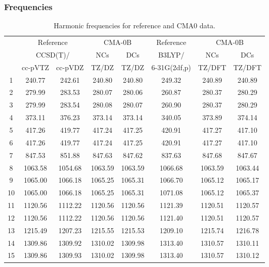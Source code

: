 \documentclass[10pt,oneside]{article}
\begin{document}
\subsubsection*{Frequencies}
\begin{table}[h!]
\centering
\caption{Harmonic frequencies for reference and CMA0 data.}
\begin{tabular}{cccccccc}
\toprule
{} & \multicolumn{2}{c}{Reference} & \multicolumn{2}{c}{CMA-0B} &    Reference & \multicolumn{2}{c}{CMA-0B} \\
{} & \multicolumn{2}{c}{CCSD(T)/} &     NCs &     DCs &       B3LYP/ &     NCs &     DCs \\
{} &   cc-pVTZ & cc-pVDZ &   TZ/DZ &   TZ/DZ & 6-31G(2df,p) &  TZ/DFT &  TZ/DFT \\
\midrule
1  &    240.77 &  242.61 &  240.80 &  240.80 &       249.32 &  240.89 &  240.89 \\
2  &    279.99 &  283.53 &  280.07 &  280.06 &       260.87 &  280.37 &  280.29 \\
3  &    279.99 &  283.54 &  280.08 &  280.07 &       260.90 &  280.37 &  280.29 \\
4  &    373.11 &  376.23 &  373.14 &  373.14 &       340.05 &  373.89 &  374.14 \\
5  &    417.26 &  419.77 &  417.24 &  417.25 &       420.91 &  417.27 &  417.10 \\
6  &    417.26 &  419.77 &  417.24 &  417.25 &       420.91 &  417.27 &  417.10 \\
7  &    847.53 &  851.88 &  847.63 &  847.62 &       837.63 &  847.68 &  847.67 \\
8  &   1063.58 & 1054.68 & 1063.59 & 1063.59 &      1066.68 & 1063.59 & 1063.44 \\
9  &   1065.00 & 1066.18 & 1065.25 & 1065.31 &      1066.70 & 1065.12 & 1065.17 \\
10 &   1065.00 & 1066.18 & 1065.25 & 1065.31 &      1071.08 & 1065.12 & 1065.37 \\
11 &   1120.56 & 1112.22 & 1120.56 & 1120.56 &      1121.39 & 1120.51 & 1120.57 \\
12 &   1120.56 & 1112.22 & 1120.56 & 1120.56 &      1121.40 & 1120.51 & 1120.57 \\
13 &   1215.49 & 1207.23 & 1215.55 & 1215.53 &      1209.10 & 1215.74 & 1216.78 \\
14 &   1309.86 & 1309.92 & 1310.02 & 1309.98 &      1313.40 & 1310.57 & 1310.11 \\
15 &   1309.86 & 1309.93 & 1310.02 & 1309.98 &      1313.40 & 1310.57 & 1310.12 \\

\end{tabular}
\end{table}
\end{document}
